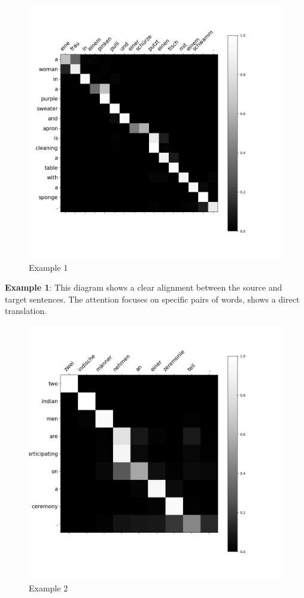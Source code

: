 \documentclass{article}
\begin{document}
\begin{figure}[H]
    \centering
    \includegraphics[width=0.8\linewidth]{25_translation.png}
    \caption{Example 1}
\end{figure}

\textbf{Example 1}: This diagram shows a clear alignment between the source and target sentences. The attention focuses on specific pairs of words, shows a direct translation.

\begin{figure}[H]
    \centering
    \includegraphics[width=0.8\linewidth]{114_translation.png}
    \caption{Example 2}
\end{figure}
\end{document}
